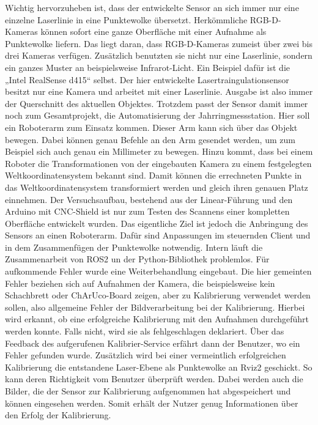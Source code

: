 	Wichtig hervorzuheben ist, dass der entwickelte Sensor an sich immer nur eine einzelne Laserlinie in eine Punktewolke übersetzt. Herkömmliche RGB-D-Kameras können sofort eine ganze Oberfläche mit einer Aufnahme als Punktewolke liefern. Das liegt daran, dass RGB-D-Kameras zumeist über zwei bis drei Kameras verfügen. Zusätzlich benutzten sie nicht nur eine Laserlinie, sondern ein ganzes Muster an beispielsweise Infrarot-Licht. Ein Beispiel dafür ist die „Intel RealSense d415“ selbst. Der hier entwickelte Lasertraingulationsensor besitzt nur eine Kamera und arbeitet mit einer Laserlinie. Ausgabe ist also immer der Querschnitt des aktuellen Objektes. Trotzdem passt der Sensor damit immer noch zum Gesamtprojekt, die Automatisierung der Jahrringmessstation. Hier soll ein Roboterarm zum Einsatz kommen. Dieser Arm kann sich über das Objekt bewegen. Dabei können genau Befehle an den Arm gesendet werden, um zum Beispiel sich auch genau ein Millimeter zu bewegen. Hinzu kommt, dass bei einem Roboter die Transformationen von der eingebauten Kamera zu einem festgelegten Weltkoordinatensystem bekannt sind. Damit können die errechneten Punkte in das Weltkoordinatensystem transformiert werden und gleich ihren genauen Platz einnehmen. Der Versuchsaufbau, bestehend aus der Linear-Führung und den Arduino mit CNC-Shield ist nur zum Testen des Scannens einer kompletten Oberfläche entwickelt wurden. Das eigentliche Ziel ist jedoch die Anbringung des Sensors an einen Roboterarm. Dafür sind Anpassungen im steuernden Client und in dem Zusammenfügen der Punktewolke notwendig. \newline
	Intern läuft die Zusammenarbeit von ROS2 un der Python-Bibliothek problemlos. Für aufkommende Fehler wurde eine Weiterbehandlung eingebaut. Die hier gemeinten Fehler beziehen sich auf Aufnahmen der Kamera, die beispielsweise kein Schachbrett oder ChArUco-Board zeigen, aber zu Kalibrierung verwendet werden sollen, also allgemeine Fehler der Bildverarbeitung bei der Kalibrierung. Hierbei wird erkannt, ob eine erfolgreiche Kalibrierung mit den Aufnahmen durchgeführt werden konnte. Falls nicht, wird sie als fehlgeschlagen deklariert. Über das Feedback des aufgerufenen Kalibrier-Service erfährt dann der Benutzer, wo ein Fehler gefunden wurde. Zusätzlich wird bei einer vermeintlich erfolgreichen Kalibrierung die entstandene Laser-Ebene als Punktewolke an Rviz2 geschickt. So kann deren Richtigkeit vom Benutzer überprüft werden. Dabei werden auch die Bilder, die der Sensor zur Kalibrierung aufgenommen hat abgespeichert und können eingesehen werden. Somit erhält der Nutzer genug Informationen über den Erfolg der Kalibrierung. 
